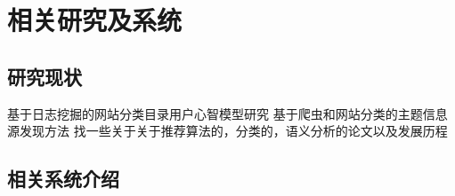 \chapter{相关研究及系统}
\section{研究现状}
基于日志挖掘的网站分类目录用户心智模型研究
基于爬虫和网站分类的主题信息源发现方法
找一些关于关于推荐算法的，分类的，语义分析的论文以及发展历程
\section{相关系统介绍}